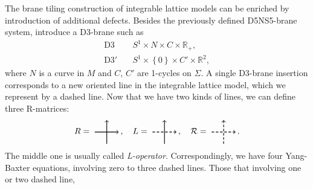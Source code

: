 The brane tiling construction of integrable lattice models can be
enriched by introduction of additional defects. Besides the previously
defined D5NS5-brane system, introduce a D3-brane such as
\begin{align}
  \mathrm{D3}    &  \quad S^{1}  \times  N  \times  C  \times  \mathbb{R}_{+},\\
  \mathrm{D3'}   &  \quad S^{1}  \times\left\{ 0\right\}  \times  C'  \times  \mathbb{R}^{2},
\end{align}
 where $N$ is a curve in $M$ and $C,\,C'$ are 1-cycles on $\Sigma$.
A single D3-brane insertion corresponds to a new oriented line in
the integrable lattice model, which we represent by a dashed line.
Now that we have two kinds of lines, we can define three R-matrices:
\begin{equation}
  R=
    \begin{tikzpicture}[scale=0.5, baseline=(x.base)]
        \node (x) at (0,0) {\vphantom{x}};

        \draw[thick, ->] (0,0) -- (2,0);
        \draw[thick, ->] (1,-1) -- (1,1);

    \end{tikzpicture}
  \, ,
  \quad
  L=
    \begin{tikzpicture}[scale=0.5, baseline=(x.base)]
        \node (x) at (0,0) {\vphantom{x}};

        \draw[thick, densely dashed, ->] (0,0) -- (2,0);
        \draw[thick, ->] (1,-1) -- (1,1);

    \end{tikzpicture}
  \, ,
  \quad
  \mathcal{R}=
    \begin{tikzpicture}[scale=0.5, baseline=(x.base)]
        \node (x) at (0,0) {\vphantom{x}};

        \draw[thick, densely dashed, ->] (0,0) -- (2,0);
        \draw[thick, densely dashed, ->] (1,-1) -- (1,1);

    \end{tikzpicture}
  \, .
\end{equation}
 The middle one is usually called \emph{L-operator}. Correspondingly,
we have four Yang-Baxter equations, involving zero to three dashed
lines. Those that involving one or two dashed line,
